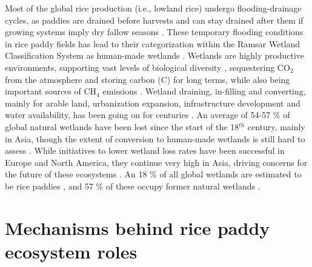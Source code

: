 Most of the global rice production (i.e., lowland rice) undergo flooding-drainage cycles, as paddies are drained before harvests and can stay drained after them if growing systems imply dry fallow seasons \citep{fitzgerald2000, haque2015}. 
These temporary flooding conditions in rice paddy fields has lead to their categorization within the Ramsar Wetland Classification System as human-made wetlands \citep{finlayson2018ramsar}. Wetlands are highly productive environments, supporting vast levels of biological diversity \citep{yoon2009}, sequestering CO$_{2}$ from the atmosphere and storing carbon (C) for long terms, while also being important sources of CH$_{4}$ emissions \citep{mitsch2018}. Wetland draining, in-filling and converting, mainly for arable land, urbanization expansion, infrastructure development and water availability, has been going on for centuries \citep{davidson1991nature, finlayson2005millennium}. An average of 54-57 \% of global natural wetlands have been lost since the start of the 18$^{th}$ century, mainly in Asia, though the extent of conversion to human-made wetlands is still hard to assess \citep{davidson2014}. While initiatives to lower wetland loss rates have been successful in Europe and North America, they continue very high in Asia, driving concerns for the future of these ecosystems \citep{mackinnon2012iucn}. An 18 \% of all global wetlands are estimated to be rice paddies \citep{yoon2009}, and 57 \% of these occupy former natural wetlands \citep{hook1993}. 

\section*{Mechanisms behind rice paddy ecosystem roles}


